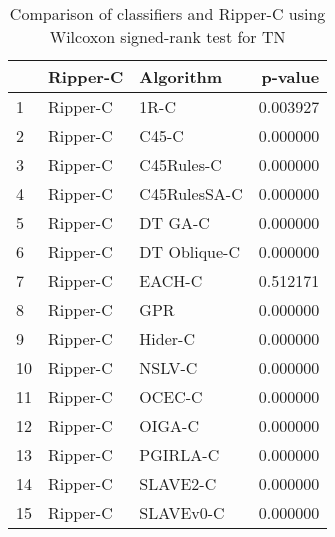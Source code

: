 \begin{table}
\footnotesize
\caption{Comparison of classifiers and Ripper-C using Wilcoxon signed-rank test for TN}
\label{tab:Ripper-C wilcoxon TN comparison}
\begin{tabular}{lllr}
\hline
 & Ripper-C & Algorithm & p-value \\
\hline
1 & Ripper-C & 1R-C & 0.003927 \\
2 & Ripper-C & C45-C & 0.000000 \\
3 & Ripper-C & C45Rules-C & 0.000000 \\
4 & Ripper-C & C45RulesSA-C & 0.000000 \\
5 & Ripper-C & DT GA-C & 0.000000 \\
6 & Ripper-C & DT Oblique-C & 0.000000 \\
7 & Ripper-C & EACH-C & 0.512171 \\
8 & Ripper-C & GPR & 0.000000 \\
9 & Ripper-C & Hider-C & 0.000000 \\
10 & Ripper-C & NSLV-C & 0.000000 \\
11 & Ripper-C & OCEC-C & 0.000000 \\
12 & Ripper-C & OIGA-C & 0.000000 \\
13 & Ripper-C & PGIRLA-C & 0.000000 \\
14 & Ripper-C & SLAVE2-C & 0.000000 \\
15 & Ripper-C & SLAVEv0-C & 0.000000 \\
\hline
\end{tabular}
\end{table}
